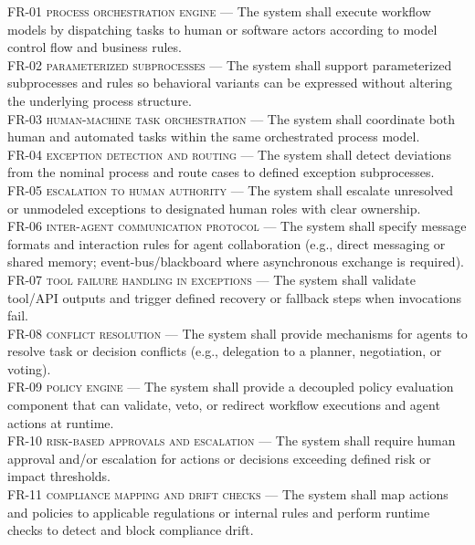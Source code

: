 \begin{footnotesize}
\noindent \textsc{FR-01 process orchestration engine} --- The system shall execute workflow models by dispatching tasks to human or software actors according to model control flow and business rules. \\
\noindent \textsc{FR-02 parameterized subprocesses} --- The system shall support parameterized subprocesses and rules so behavioral variants can be expressed without altering the underlying process structure. \\
\noindent \textsc{FR-03 human-machine task orchestration} --- The system shall coordinate both human and automated tasks within the same orchestrated process model. \\
\noindent \textsc{FR-04 exception detection and routing} --- The system shall detect deviations from the nominal process and route cases to defined exception subprocesses. \\
\noindent \textsc{FR-05 escalation to human authority} --- The system shall escalate unresolved or unmodeled exceptions to designated human roles with clear ownership. \\
\noindent \textsc{FR-06 inter-agent communication protocol} --- The system shall specify message formats and interaction rules for agent collaboration (e.g., direct messaging or shared memory; event-bus/blackboard where asynchronous exchange is required).\\
\noindent \textsc{FR-07 tool failure handling in exceptions} --- The system shall validate tool/API outputs and trigger defined recovery or fallback steps when invocations fail.\\
\noindent \textsc{FR-08 conflict resolution} --- The system shall provide mechanisms for agents to resolve task or decision conflicts (e.g., delegation to a planner, negotiation, or voting).\\
\noindent \textsc{FR-09 policy engine} --- The system shall provide a decoupled policy evaluation component that can validate, veto, or redirect workflow executions and agent actions at runtime. \\
\noindent \textsc{FR-10 risk-based approvals and escalation} --- The system shall require human approval and/or escalation for actions or decisions exceeding defined risk or impact thresholds. \\
\noindent \textsc{FR-11 compliance mapping and drift checks} --- The system shall map actions and policies to applicable regulations or internal rules and perform runtime checks to detect and block compliance drift. \\

\end{footnotesize}
